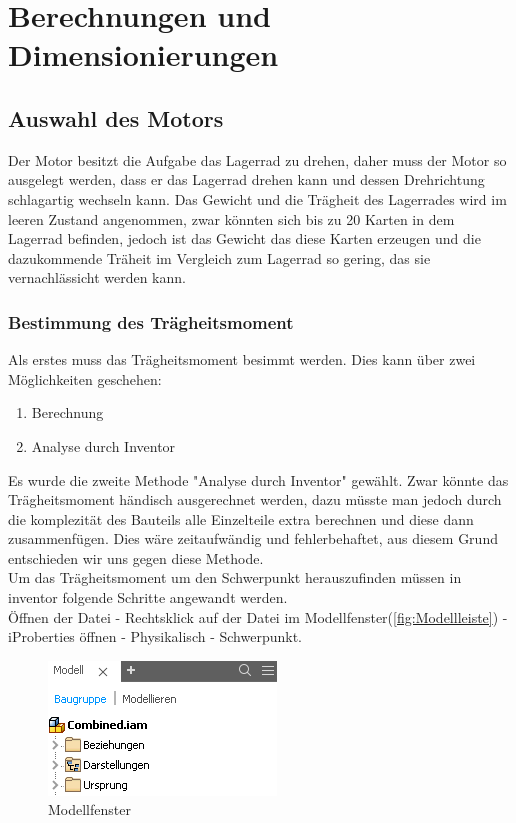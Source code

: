 \section{Berechnungen und Dimensionierungen}
\subsection{Auswahl des Motors}

Der Motor  besitzt die Aufgabe das Lagerrad zu drehen, daher muss der Motor so ausgelegt werden, dass
er das Lagerrad drehen kann und dessen Drehrichtung schlagartig wechseln kann. Das Gewicht und die Trägheit des
Lagerrades wird im leeren Zustand angenommen, zwar könnten sich bis zu 20 Karten in dem Lagerrad befinden,
jedoch ist das Gewicht das diese Karten erzeugen und die dazukommende Träheit im Vergleich zum Lagerrad
so gering, das sie vernachlässicht werden kann.

\subsubsection{Bestimmung des Trägheitsmoment}

Als erstes muss das Trägheitsmoment besimmt werden. Dies kann über zwei Möglichkeiten geschehen:
\begin{enumerate}
    \item Berechnung
    \item Analyse durch Inventor
\end{enumerate}

Es wurde die zweite Methode "Analyse durch Inventor" gewählt. Zwar könnte das Trägheitsmoment händisch ausgerechnet werden,
dazu müsste man jedoch durch die komplezität des Bauteils alle Einzelteile extra berechnen und diese dann zusammenfügen.
Dies wäre zeitaufwändig und fehlerbehaftet, aus diesem Grund entschieden wir uns gegen diese Methode. \\

Um das Trägheitsmoment um den Schwerpunkt herauszufinden müssen in inventor folgende Schritte
angewandt werden.\\
Öffnen der Datei - Rechtsklick auf der Datei im Modellfenster(\autoref{fig:Modellleiste}) - iProberties öffnen - Physikalisch -  Schwerpunkt.\\
\begin{figure}[H]
    \centering
    \includegraphics[scale=1,page=1]{fig/mech/Modellfenser}
    \caption{Modellfenster}
    \label{fig:Modellleiste}
\end{figure}


